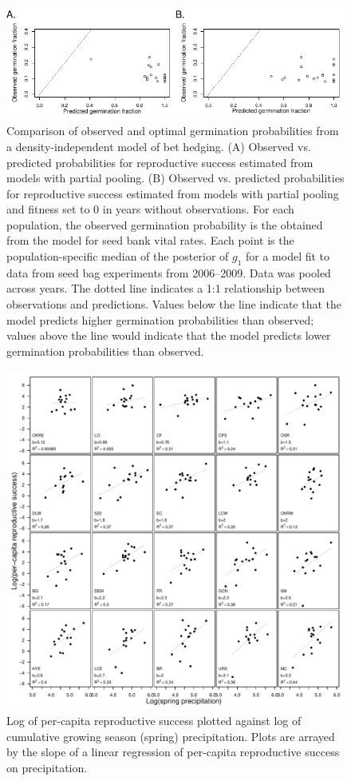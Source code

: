 \documentclass[12pt, oneside, titlepage]{article}   	%
\begin{document}
{ 
  \begin{figure}[h]
   \centering
       \includegraphics[page=1,width=.9\textwidth]{../manuscript/figures/analysis-figure-2.pdf}  
    \caption{ Comparison of observed and optimal germination probabilities from a density-independent model of bet hedging. (A) Observed vs. predicted probabilities for reproductive success estimated from models with partial pooling. (B) Observed vs. predicted probabilities for reproductive success estimated from models with partial pooling and fitness set to 0 in years without observations. For each population, the observed germination probability is the obtained from the model for seed bank vital rates. Each point is the population-specific median of the posterior of $g_1$ for a model fit to data from seed bag experiments from 2006--2009. Data was pooled across years. The dotted line indicates a 1:1 relationship between observations and predictions. Values below the line indicate that the model predicts higher germination probabilities than observed; values above the line would indicate that the model predicts lower germination probabilities than observed. }
 \label{fig:obs-pred-lowFitness}
\end{figure}

\begin{figure}[!h]
       \includegraphics[width=\textwidth]{../figures/analysis/rs-climate-sensitivity.pdf}  
    \caption{ Log of per-capita reproductive success plotted against log of cumulative growing season (spring) precipitation. Plots are arrayed by the slope of a linear regression of per-capita reproductive success on precipitation. }
\end{figure}

}
\end{document}
